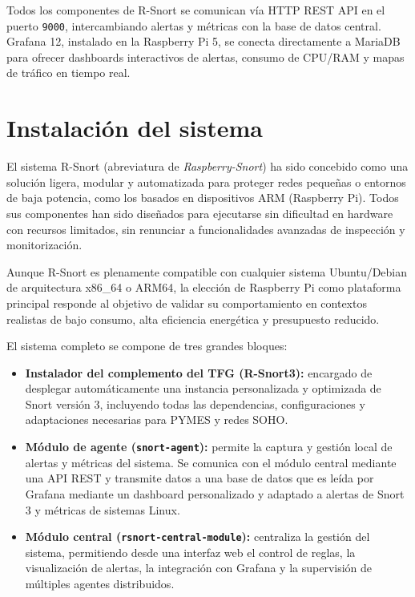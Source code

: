 \documentclass[11pt,a4paper,twoside]{report}
\begin{document}
Todos los componentes de R-Snort se comunican vía HTTP REST API en el puerto \texttt{9000}, intercambiando alertas y métricas con la base de datos central. Grafana 12, instalado en la Raspberry Pi 5, se conecta directamente a MariaDB para ofrecer dashboards interactivos de alertas, consumo de CPU/RAM y mapas de tráfico en tiempo real.

\section{Instalación del sistema}

El sistema R-Snort (abreviatura de \textit{Raspberry-Snort}) ha sido concebido como una solución ligera, modular y automatizada para proteger redes pequeñas o entornos de baja potencia, como los basados en dispositivos ARM (Raspberry Pi). Todos sus componentes han sido diseñados para ejecutarse sin dificultad en hardware con recursos limitados, sin renunciar a funcionalidades avanzadas de inspección y monitorización.\newline

Aunque R-Snort es plenamente compatible con cualquier sistema Ubuntu/Debian de arquitectura x86\_64 o ARM64, la elección de Raspberry Pi como plataforma principal responde al objetivo de validar su comportamiento en contextos realistas de bajo consumo, alta eficiencia energética y presupuesto reducido.\newline

El sistema completo se compone de tres grandes bloques:

\begin{itemize}
	\item \textbf{Instalador del complemento del TFG (R-Snort3):} encargado de desplegar automáticamente una instancia personalizada y optimizada de Snort versión 3, incluyendo todas las dependencias, configuraciones y adaptaciones necesarias para PYMES y redes SOHO.
	
	\item \textbf{Módulo de agente (\texttt{snort-agent}):} permite la captura y gestión local de alertas y métricas del sistema. Se comunica con el módulo central mediante una API REST y transmite datos a una base de datos que es leída por Grafana mediante un dashboard personalizado y adaptado a alertas de Snort 3 y métricas de sistemas Linux.
	
	\item \textbf{Módulo central (\texttt{rsnort-central-module}):} centraliza la gestión del sistema, permitiendo desde una interfaz web el control de reglas, la visualización de alertas, la integración con Grafana y la supervisión de múltiples agentes distribuidos.
\end{itemize}
\end{document}
